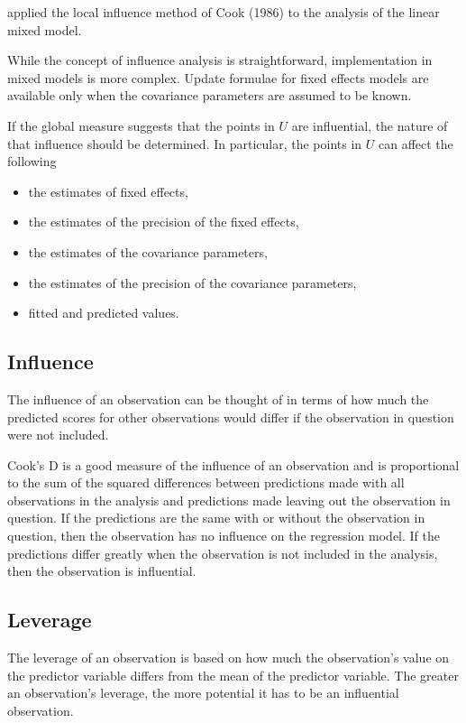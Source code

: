 \documentclass[12pt, a4paper]{article}
\begin{document}
			
			 \citet{Beckman} applied the local influence method of Cook (1986) to the analysis of the linear mixed model.
			
			While the concept of influence analysis is straightforward, implementation in mixed models is more complex. Update formulae for fixed effects models are available only when the covariance parameters are assumed to be known.
			
			If the global measure suggests that the points in $U$ are influential, the nature of that influence should be determined. In particular, the points in $U$ can affect the following
			
			\begin{itemize}
				\item the estimates of fixed effects,
				\item the estimates of the precision of the fixed effects,
				\item the estimates of the covariance parameters,
				\item the estimates of the precision of the covariance parameters,
				\item fitted and predicted values.
			\end{itemize}

			
			
			
			
			\subsection{Influence}
			The influence of an observation can be thought of in terms of how much the predicted scores for other observations would differ if the observation in question were not included. 
			
			Cook's D is a good measure of the influence of an observation and is proportional to the sum of the squared differences between predictions made with all observations in the analysis and predictions made leaving out the observation in question. If the predictions are the same with or without the observation in question, then the observation has no influence on the regression model. If the predictions differ greatly when the observation is not included in the analysis, then the observation is influential.
			
			\subsection{Leverage}
			The leverage of an observation is based on how much the observation's value on the predictor variable differs from the mean of the predictor variable. The greater an observation's leverage, the more potential it has to be an influential observation. 
			
\end{document}
